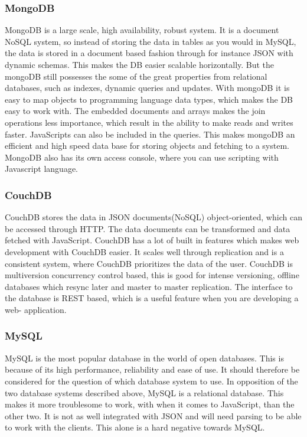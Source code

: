 \subsubsection*{MongoDB}
MongoDB is a large scale, high availability, robust system. It is a document NoSQL system, so instead of storing the data in tables as you would in MySQL, the data is stored in a document based fashion through for instance JSON with dynamic schemas. This makes the DB easier scalable horizontally. But the mongoDB still possesses the some of the great properties from relational databases, such as indexes, dynamic queries and updates. With mongoDB it is easy to map objects to programming language data types, which makes the DB easy to work with. The embedded documents and arrays makes the join operations less importance, which result in the ability to make reads and writes faster. JavaScripts can also be included in the queries. This makes mongoDB an efficient and high speed data base for storing objects and fetching to a system. MongoDB also has its own access console, where you can use scripting with Javascript language. \cite{mongodb-intro}

\subsubsection*{CouchDB}
CouchDB stores the data in JSON documents(NoSQL) object-oriented, which can be accessed through HTTP. The data documents can be transformed and data fetched with JavaScript. CouchDB has a lot of built in features which makes web development with CouchDB easier. It scales well through replication and is a consistent system, where CouchDB prioritizes the data of the user. CouchDB is multiversion concurrency control based, this is good for intense versioning, offline databases which resync later and master to master replication. The interface to the database is REST based, which is a useful feature when you are developing a web- application.
\cite{couchdb-about, couchdb-technical}

\subsubsection*{MySQL}
MySQL is the most popular database in the world of open databases. This is because of its high performance, reliability and ease of use. It should therefore be considered for the question of which database system to use. In opposition of the two database systems described above, MySQL is a relational database. This makes it more troublesome to work, with when it comes to JavaScript, than the other two. It is not as well integrated with JSON and will need parsing to be able to work with the clients. This alone is a hard negative towards MySQL.
\cite{mysql-about}



